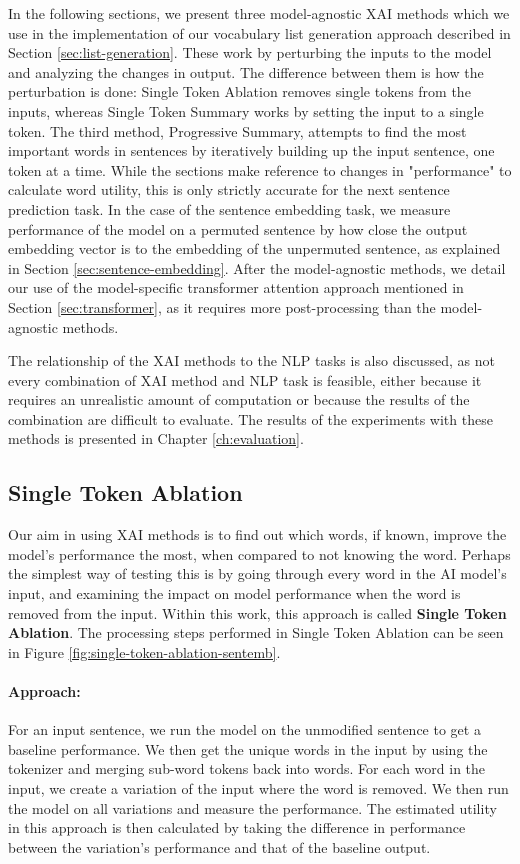 In the following sections, we present three model-agnostic XAI methods which we use in the implementation of our vocabulary list generation approach described in Section \ref{sec:list-generation}.
These work by perturbing the inputs to the model and analyzing the changes in output.
The difference between them is how the perturbation is done:
Single Token Ablation removes single tokens from the inputs, whereas Single Token Summary works by setting the input to a single token.
The third method, Progressive Summary, attempts to find the most important words in sentences by iteratively building up the input sentence, one token at a time.
While the sections make reference to changes in "performance" to calculate word utility, this is only strictly accurate for the next sentence prediction task.
In the case of the sentence embedding task, we measure performance of the model on a permuted sentence by how close the output embedding vector is to the embedding of the unpermuted sentence, as explained in Section \ref{sec:sentence-embedding}.
After the model-agnostic methods, we detail our use of the model-specific transformer attention approach mentioned in Section \ref{sec:transformer}, as it requires more post-processing than the model-agnostic methods.

The relationship of the XAI methods to the NLP tasks is also discussed, as not every combination of XAI method and NLP task is feasible, either because it requires an unrealistic amount of computation or because the results of the combination are difficult to evaluate.
The results of the experiments with these methods is presented in Chapter \ref{ch:evaluation}.


\subsection{Single Token Ablation}
Our aim in using XAI methods is to find out which words, if known, improve the model's performance the most, when compared to not knowing the word.
Perhaps the simplest way of testing this is by going through every word in the AI model's input, and examining the impact on model performance when the word is removed from the input.
Within this work, this approach is called \textbf{Single Token Ablation}.
The processing steps performed in Single Token Ablation can be seen in Figure \ref{fig:single-token-ablation-sentemb}.

\paragraph{Approach:}
For an input sentence, we run the model on the unmodified sentence to get a baseline performance.
We then get the unique words in the input by using the tokenizer and merging sub-word tokens back into words.
For each word in the input, we create a variation of the input where the word is removed.
We then run the model on all variations and measure the performance.
The estimated utility in this approach is then calculated by taking the difference in performance between the variation's performance and that of the baseline output.

